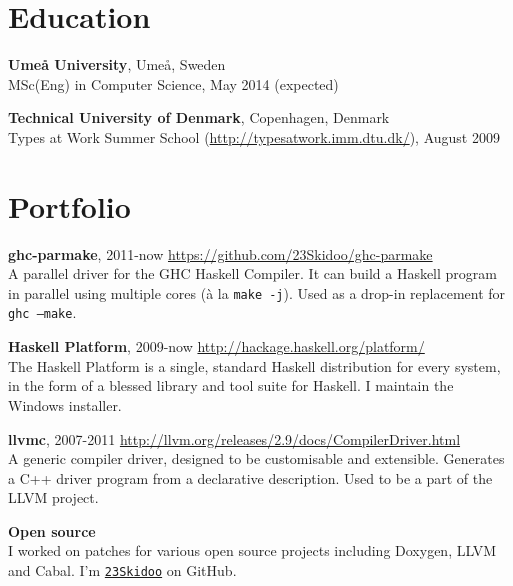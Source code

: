 \documentclass[margin,line]{res}
\begin{document}
\begin{resume}

\section{\sc Education}
{\bf Umeå University}, Umeå, Sweden\\
MSc(Eng) in Computer Science, May 2014 (expected)

{\bf Technical University of Denmark}, Copenhagen, Denmark\\
Types at Work Summer School (\url{http://typesatwork.imm.dtu.dk/}), August 2009

\section{\sc Portfolio}

{\bf ghc-parmake}, 2011-now \hfill \url{https://github.com/23Skidoo/ghc-parmake}\\
A parallel driver for the GHC Haskell Compiler. It can build a Haskell
program in parallel using multiple cores (à la \texttt{make -j}). Used as a
drop-in replacement for \texttt{ghc --make}.

{\bf Haskell Platform}, 2009-now \hfill \url{http://hackage.haskell.org/platform/}\\
The Haskell Platform is a single, standard Haskell distribution for every
system, in the form of a blessed library and tool suite for Haskell. I maintain
the Windows installer.

{\bf llvmc}, 2007-2011 \hfill \url{http://llvm.org/releases/2.9/docs/CompilerDriver.html}\\
A generic compiler driver, designed to be customisable and extensible. Generates
a C++ driver program from a declarative description. Used to be a part of the
LLVM project.


{\bf Open source}\\ I worked on patches for various open source projects
including Doxygen, LLVM and Cabal. I'm
\href{https://github.com/23Skidoo/}{\texttt{23Skidoo}} on GitHub.


\end{resume}
\end{document}

